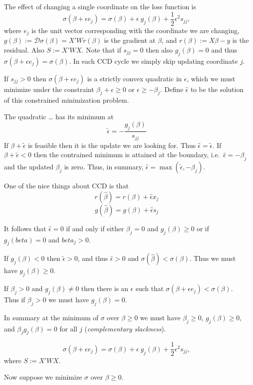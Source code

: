 \documentclass[
  12pt,
]{article}
\begin{document}
The effect of changing a single coordinate on the loss function is \[
\sigma(\beta+\epsilon e_j)=\sigma(\beta)+\epsilon\ g_j(\beta)+\frac12\epsilon^2s_{jj},
\] where \(e_j\) is the unit vector corresponding with the coordinate we
are changing, \(g(\beta):=\mathcal{D}\sigma(\beta)=X'Wr(\beta)\) is the
gradient at \(\beta\), and \(r(\beta):=X\beta-y\) is the residual. Also
\(S:=X'WX\). Note that if \(s_{jj}=0\) then also \(g_j(\beta)=0\) and thus
\(\sigma(\beta+\epsilon e_j)=\sigma(\beta)\). In each CCD cycle we simply
skip updating coordinate \(j\).

If \(s_{jj}>0\) then \(\sigma(\beta+\epsilon e_j)\) is a strictly convex
quadratic in \(\epsilon\), which we must minimize under the constraint
\(\beta_j+\epsilon\geq 0\) or \(\epsilon\geq-\beta_j\). Define
\(\hat\epsilon\) to be the solution of this constrained minimization
problem.

The quadratic \ldots{} has its minimum at \[
\tilde\epsilon=-\frac{g_j(\beta)}{s_{jj}}
\] If \(\beta+\tilde\epsilon\) is feasible then it is the update we are
looking for. Thus \(\hat\epsilon=\tilde\epsilon\). If
\(\beta+\tilde\epsilon<0\) then the contrained minimum is attained at the
boundary, i.e.~\(\hat\epsilon=-\beta_j\) and the updated \(\beta_j\) is
zero. Thus, in summary, \(\hat\epsilon=\max(\tilde\epsilon,-\beta_j)\).

One of the nice things about CCD is that \[
r(\hat\beta)=r(\beta)+\hat\epsilon x_j
\] \[
g(\hat\beta)=g(\beta)+\hat\epsilon s_j
\]

It follows that \(\hat\epsilon=0\) if and only if either \(\beta_j=0\) and
\(g_j(\beta)\geq 0\) or if \(g_j(beta)=0\) and \(beta_j>0\).

If \(g_j(\beta)<0\) then \(\tilde\epsilon>0\), and thus \(\hat\epsilon>0\) and
\(\sigma(\hat\beta)<\sigma(\beta)\). Thus we must have \(g_j(\beta)\geq 0\).

If \(\beta_j>0\) and \(g_j(\beta)\not=0\) then there is an \(\epsilon\) such
that \(\sigma(\beta+\epsilon e_j)<\sigma(\beta)\). Thus if \(\beta_j>0\) we
must have \(g_j(\beta)=0\).

In summary at the minimum of \(\sigma\) over \(\beta\geq 0\) we must have
\(\beta_j\geq 0\), \(g_j(\beta)\geq 0\), and \(\beta_jg_j(\beta)=0\) for all
\(j\) (\emph{complementary slackness}).

\[
\sigma(\beta+\epsilon e_j)=\sigma(\beta)+\epsilon\ g_j(\beta)+\frac12\epsilon^2s_{jj},
\] where \(S:=X'WX\).

Now suppose we minimize \(\sigma\) over \(\beta\geq 0\).
\end{document}
